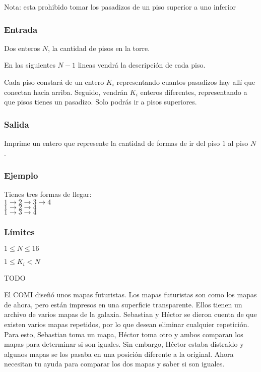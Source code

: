 Nota: esta prohibido tomar los pasadizos de un piso superior a uno inferior

\subsubsection*{Entrada}
Dos enteros \(N\), la cantidad de pisos en la torre.

En las siguientes \(N-1\) lineas vendrá la descripción de cada piso. 

Cada piso constará de un entero \(K_i\) representando cuantos pasadizos hay allí que conectan hacia arriba. Seguido, vendrán \(K_i\) enteros diferentes, representando a que pisos tienes un pasadizo. Solo podrás ir a pisos superiores.

\subsubsection*{Salida}
Imprime un entero que represente la cantidad de formas de ir del piso \(1\) al piso \(N\).

\subsubsection*{Ejemplo}
\begin{casebox3}
	{
		Tienes tres formas de llegar:\\
		\(1\rightarrow2\rightarrow3\rightarrow4\)\\
		\(1\rightarrow2\rightarrow4\)\\
		\(1\rightarrow3\rightarrow4\)\\
	}
\end{casebox3}

\subsubsection*{Límites}
\begin{plimits}
	\item \(1\leq N\leq 16\)
	\item \(1\leq K_i< N\)
\end{plimits}

\omegalink{} TODO

\problembreak

\problemtitle El COMI diseñó unos mapas futuristas. Los mapas futuristas son como los mapas de ahora, pero están impresos en una superficie transparente. Ellos tienen un archivo de varios mapas de la galaxia. Sebastian y Héctor se dieron cuenta de que existen varios mapas repetidos, por lo que desean eliminar cualquier repetición. Para esto, Sebastian toma un mapa, Héctor toma otro y ambos comparan los mapas para determinar si son iguales. Sin embargo, Héctor estaba distraído y algunos mapas se los pasaba en una posición diferente a la original. Ahora necesitan tu ayuda para comparar los dos mapas y saber si son iguales.

